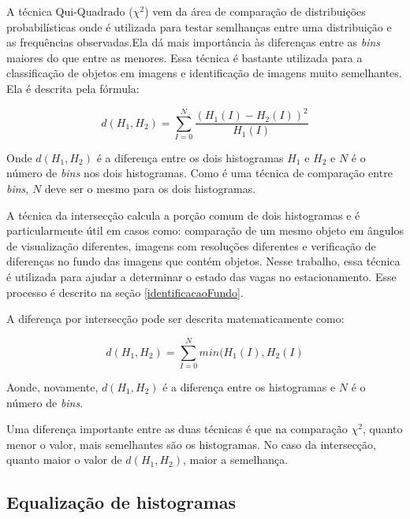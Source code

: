         A técnica Qui-Quadrado ($\chi^{2}$) vem da área de comparação de distribuições probabilísticas onde é utilizada para testar semlhanças entre uma distribuição e as frequências observadas\cite{pele2010quadratic}.Ela dá mais importância às diferenças entre as \textit{bins} maiores do que entre as menores. Essa técnica é bastante utilizada para a classificação de objetos em imagens e identificação de imagens muito semelhantes. Ela é descrita pela fórmula:

        \begin{equation}\label{quiQuadrado}
          d(H_{1}, H_{2}) = \sum_{I = 0}^{N}\frac{(H_{1}(I) - H_{2}(I))^2}{H_{1}(I)}
        \end{equation}


        Onde $d(H_{1}, H_{2})$ é a diferença entre os dois histogramas $H_{1}$ e $H_{2}$ e $N$ é o número de \textit{bins} nos dois histogramas. Como é uma técnica de comparação entre \textit{bins}, $N$ deve ser o mesmo para os dois histogramas.

        A técnica da intersecção calcula a porção comum de dois histogramas e é particularmente útil em casos como: comparação de um mesmo objeto em ângulos de visualização diferentes, imagens com resoluções diferentes e verificação de diferenças no fundo das imagens que contém objetos. Nesse trabalho, essa técnica é utilizada para ajudar a determinar o estado das vagas no estacionamento. Esse processo é descrito na seção \ref{identificacaoFundo}.

        A diferença por intersecção pode ser descrita matematicamente como:

        \begin{equation}\label{intersecção}
          d(H_{1}, H_{2}) = \sum_{I = 0}^{N}min(H_{1}(I), H_{2}(I)
        \end{equation}

        Aonde, novamente, $d(H_{1}, H_{2})$ é a diferença entre os histogramas e $N$ é o número de \textit{bins}.


        Uma diferença importante entre as duas técnicas é que na comparação $\chi^{2}$, quanto menor o valor, mais semelhantes são os histogramas. No caso da intersecção, quanto maior o valor de $d(H_{1}, H_{2})$, maior a semelhança.

        \subsection{Equalização de histogramas} \label{equalizacaoHistogramas}


